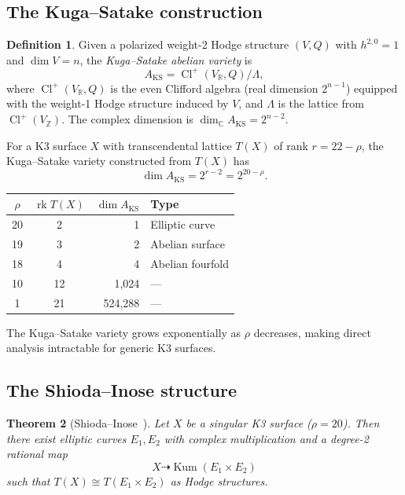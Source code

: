 \documentclass[11pt,a4paper]{article}
\theoremstyle{plain}
\newtheorem{theorem}{Theorem}[section]
\theoremstyle{definition}
\newtheorem{definition}[theorem]{Definition}
\newcommand{\Z}{\mathbb{Z}}
\newcommand{\R}{\mathbb{R}}
\newcommand{\C}{\mathbb{C}}
\DeclareMathOperator{\Cl}{Cl}
\DeclareMathOperator{\rk}{rk}
\DeclareMathOperator{\Kum}{Kum}
\begin{document}
\subsection{The Kuga--Satake construction}

\begin{definition}
Given a polarized weight-2 Hodge structure $(V, Q)$ with $h^{2,0} = 1$ and $\dim V = n$, the \emph{Kuga--Satake abelian variety} is
\[
A_{\mathrm{KS}} = \Cl^+(V_\R, Q) / \Lambda,
\]
where $\Cl^+(V_\R, Q)$ is the even Clifford algebra (real dimension $2^{n-1}$) equipped with the weight-1 Hodge structure induced by $V$, and $\Lambda$ is the lattice from $\Cl^+(V_\Z)$. The complex dimension is $\dim_\C A_{\mathrm{KS}} = 2^{n-2}$.
\end{definition}

For a K3 surface $X$ with transcendental lattice $T(X)$ of rank $r = 22 - \rho$, the Kuga--Satake variety constructed from $T(X)$ has
\begin{equation}\label{eq:ks-dim}
  \dim A_{\mathrm{KS}} = 2^{r - 2} = 2^{20 - \rho}.
\end{equation}

\begin{center}
\begin{tabular}{ccrl}
\toprule
$\rho$ & $\rk T(X)$ & $\dim A_{\mathrm{KS}}$ & Type \\
\midrule
20 & 2 & 1 & Elliptic curve \\
19 & 3 & 2 & Abelian surface \\
18 & 4 & 4 & Abelian fourfold \\
10 & 12 & 1{,}024 & --- \\
1 & 21 & 524{,}288 & --- \\
\bottomrule
\end{tabular}
\end{center}

The Kuga--Satake variety grows exponentially as $\rho$ decreases, making direct analysis intractable for generic K3 surfaces.

\subsection{The Shioda--Inose structure}

\begin{theorem}[Shioda--Inose~\cite{shioda-inose}]\label{thm:SI}
Let $X$ be a singular K3 surface ($\rho = 20$). Then there exist elliptic curves $E_1, E_2$ with complex multiplication and a degree-2 rational map
\[
X \dashrightarrow \Kum(E_1 \times E_2)
\]
such that $T(X) \cong T(E_1 \times E_2)$ as Hodge structures.
\end{theorem}
\end{document}
